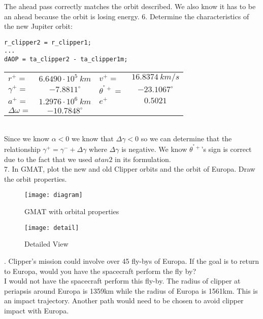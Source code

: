 \documentclass[hidelinks,12pt]{article}
\begin{document}
The ahead pass correctly matches the orbit described. We also know it has to be an ahead because the orbit is losing energy.
\vspace{10px}
6. Determine the characteristics of the new Jupiter orbit:\\
\begin{lstlisting}[frame=lines,style=Matlab-editor,basicstyle = \mlttfamily]
r_clipper2 = r_clipper1;
...
dAOP = ta_clipper2 - ta_clipper1m;
\end{lstlisting}
\begin{tabular}{lclc}
$r^+=$&$6.6490 \cdot 10^5~km$&$v^+=$&$16.8374~km/s$\\
$\gamma^+=$&$-7.8811^\circ$&$\theta^{^*+}=$&$-23.1067^\circ$\\
$a^+=$&$1.2976 \cdot 10^6~km$&$e^+$&$0.5021$\\
$\Delta \omega=$&$-10.7848^\circ$
\end{tabular}\\
Since we know $\alpha < 0$ we know that $\Delta \gamma < 0$ so we can determine that the relationship $\gamma^+ = \gamma^- + \Delta \gamma$ where $\Delta \gamma$ is negative. We know $\theta^{^*+}$'s sign is correct due to the fact that we used $atan2$ in its formulation.\\
\vspace{10px}
7. In GMAT, plot the new and old Clipper orbits and the orbit of Europa. Draw the orbit properties.\\
\begin{figure}[!htb]
  \center
  \texttt{[image: diagram]}
  \caption{GMAT with orbital properties}
  \label{fig:Fig1}
\end{figure}
\begin{figure}[!htb]
  \center
  \texttt{[image: detail]}
  \caption{Detailed View}
  \label{fig:Fig2}
\end{figure}

\vspace{10px}
. Clipper's mission could involve over 45 fly-bys of Europa. If the goal is to return to Europa, would you have the spacecraft perform the fly by?\\
I would not have the spacecraft perform this fly-by. The radius of clipper at periapsis around Europa is 1359km while the radius of Europa is 1561km. This is an impact trajectory. Another path would need to be chosen to avoid clipper impact with Europa.
\newpage

\end{document}
